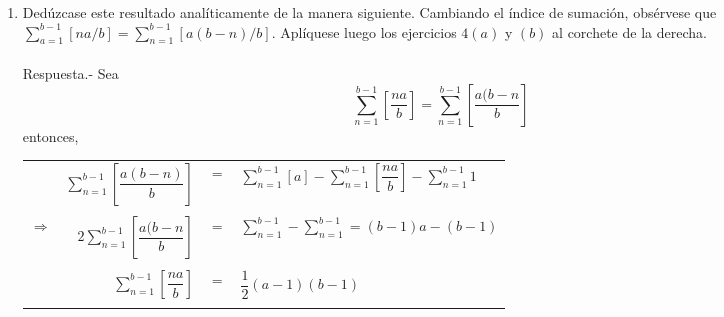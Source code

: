 \begin{enumerate}[ \bfseries 1.]
\begin{enumerate}[\bfseries (a)]
	    \item Dedúzcase este resultado analíticamente de la manera siguiente. Cambiando el índice de sumación, obsérvese que $\sum\limits_{a=1}^{b-1}[na/b]=\sum\limits_{n=1}^{b-1}[a(b-n)/b]$. Aplíquese luego los ejercicios $4(a)$ y $(b)$  al corchete de la derecha.\\\\
		Respuesta.-\; Sea $$ \sum\limits_{n=1}^{b-1} \left[\dfrac{na}{b}\right] =  \sum\limits_{n=1}^{b-1} \left[\dfrac{a(b-n}{b}\right] $$
		entonces,
		\begin{center}
		    \begin{tabular}{crcl}
			&$\sum\limits_{n=1}^{b-1} \left[\dfrac{a(b-n)}{b}\right]$&$=$&$\sum\limits_{n=1}^{b-1} \left[a\right] - \sum\limits_{n=1}^{b-1} \left[\dfrac{na}{b}\right] - \sum\limits_{n=1}^{b-1} 1$\\\\
			$\Longrightarrow$&$2\sum\limits_{n=1}^{b-1} \left[\dfrac{a(b-n}{b}\right]$&$=$&$\sum\limits_{n=1}^{b-1} - \sum\limits_{n=1}^{b-1} = (b-1)a - (b-1)$\\\\
			&$\sum\limits_{n=1}^{b-1} \left[\dfrac{na}{b}\right]$&$=$&$\dfrac{1}{2}(a-1)(b-1)$\\\\
		    \end{tabular}
		\end{center}

	\end{enumerate} 


\end{enumerate}
